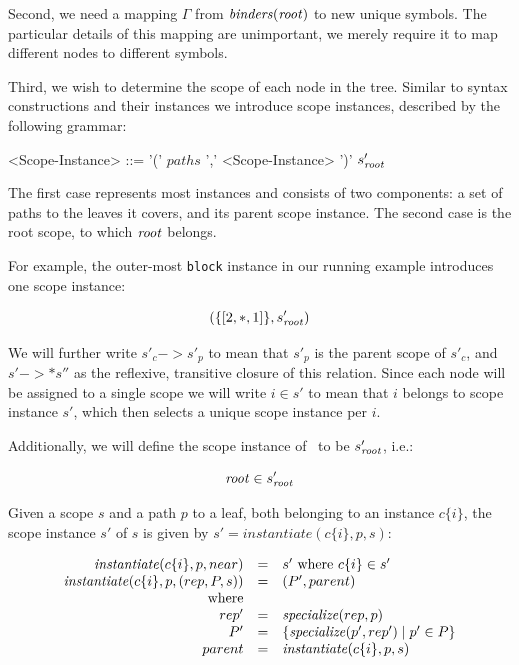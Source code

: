 \documentclass{kththesis}
\begin{document}
Second, we need a mapping $\Gamma$ from $\mathit{binders}(\mathit{root})$ to new unique symbols. The particular details of this mapping are unimportant, we merely require it to map different nodes to different symbols.

Third, we wish to determine the scope of each node in the tree. Similar to syntax constructions and their instances we introduce scope instances, described by the following grammar:

\newcommand{\rootscope}{\ensuremath{s'_{\rooti}}}

\begin{grammar}
<Scope-Instance> ::= '(' $paths$ ',' <Scope-Instance> ')'
  \alt \rootscope
\end{grammar}

The first case represents most instances and consists of two components: a set of paths to the leaves it covers, and its parent scope instance. The second case is the root scope, to which $\mathit{root}$ belongs.

For example, the outer-most \texttt{block} instance in our running example introduces one scope instance:

$$
(\{[2, *, 1]\}, \rootscope)
$$

We will further write $s'_c -> s'_p$ to mean that $s'_p$ is the parent scope of $s'_c$, and $s' ->* s''$ as the reflexive, transitive closure of this relation. Since each node will be assigned to a single scope we will write $i \in s'$ to mean that $i$ belongs to scope instance $s'$, which then selects a unique scope instance per $i$.

Additionally, we will define the scope instance of \rooti\ to be \rootscope, i.e.:

$$ \rooti \in \rootscope $$

\newcommand{\instantiate}{\ensuremath{\mathit{instantiate}}}

Given a scope $s$ and a path $p$ to a leaf, both belonging to an instance $c\{i\}$, the scope instance $s'$ of $s$ is given by $s' = \instantiate(c\{i\}, p, s)$:

$$
\begin{array}{rcl}
\instantiate(c\{i\}, p, near) & = & s' \text{ where } c\{i\} \in s' \\
\instantiate(c\{i\}, p, \text{(}rep, P, s\text{)}) & = & \text{(}P', parent\text{)} \\
\text{where} & & \\
rep' & = & \specialize(rep, p) \\
P' & = & \{\specialize(p', rep') \mid p' \in P\} \\
parent & = & \instantiate(c\{i\}, p, s) \\
\end{array}
$$
\end{document}
